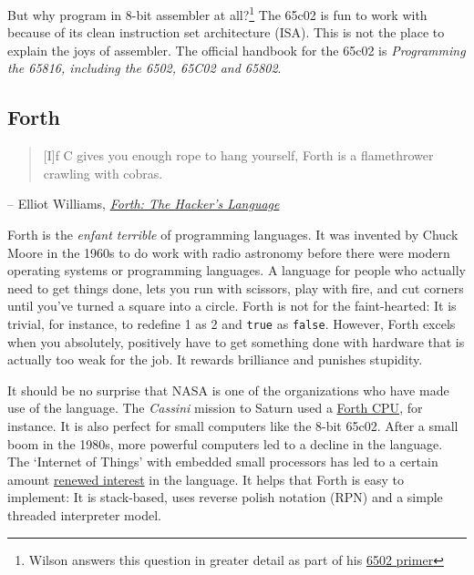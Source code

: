 But why program in 8-bit assembler at all?\footnote{Wilson answers this question in greater detail as part of his
\href{http://wilsonminesco.com/6502primer/65tutor\_intro.html}{6502 primer}} The
65c02 is fun to work with because of its clean instruction set architecture
(ISA). This
is not the place to explain the joys of assembler. The official handbook for the
65c02 is \textit{Programming the 65816, including the 6502, 65C02 and
65802}\cite{eyeslichty}.

\subsection{Forth}

\begin{quote}
        [I]f C gives you enough rope to hang yourself, Forth is a flamethrower
        crawling with cobras.
\end{quote}
\begin{flushright}
        -- Elliot Williams, \href{https://hackaday.com/2017/01/27/forth-the-hackers-language/}{
        \textit{Forth: The Hacker's Language}}
\end{flushright}

Forth is the \textit{enfant terrible} of programming
languages. It was invented by Chuck Moore in the 1960s to do
work with radio astronomy before there were modern operating systems or
programming languages. A language for people who actually need to get things
done, lets you run with scissors, play with fire, and cut corners until you've
turned a square into a circle. Forth is not for the faint-hearted: It is
trivial, for instance, to redefine 1 as 2 and \texttt{true} as \texttt{false}.
However, Forth excels when you absolutely, positively have to get something done
with hardware that is actually too weak for the job. It rewards brilliance and
punishes stupidity.

It should be no surprise that NASA is one of the organizations who
have made use of the language. The \textit{Cassini}
mission to Saturn used a
\href{http://www.cpushack.com/2013/02/21/charles-moore-forth-stack-processors/}{Forth
CPU}, for instance. It is also perfect for small computers like the 8-bit 65c02.
After a small boom in the 1980s, more powerful computers led to a decline in the
language. The `Internet of Things' with embedded small processors has led to a
certain amount
\href{https://www.embedded.com/design/programming-languages-and-tools/4431133/Go-Forth-}{renewed
interest} in the language. It helps that Forth is easy to implement: It is
stack-based, uses reverse polish notation (RPN) and a simple threaded interpreter
model. 

